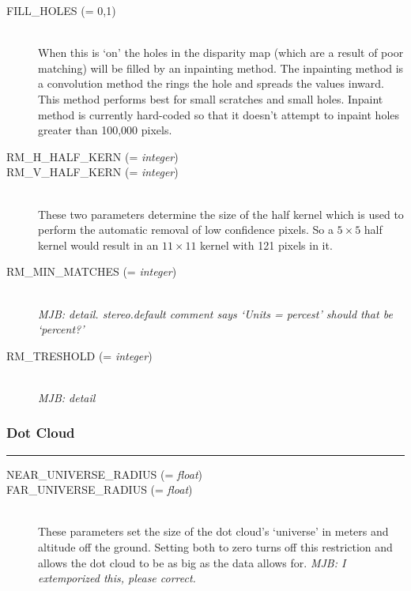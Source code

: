 \begin{description}

\item[FILL\_HOLES \textnormal{\small{(= 0,1)}}] \hfill \\

  When this is `on' the holes in the disparity map (which are a result
  of poor matching) will be filled by an inpainting method. The
  inpainting method is a convolution method the rings the hole and
  spreads the values inward. This method performs best for small
  scratches and small holes. Inpaint method is currently hard-coded so
  that it doesn't attempt to inpaint holes greater than 100,000
  pixels.

\item[RM\_H\_HALF\_KERN \textnormal{\small{(= \emph{integer})}}]
\item[RM\_V\_HALF\_KERN \textnormal{\small{(= \emph{integer})}}] \hfill \\

  These two parameters determine the size of the half kernel which is
  used to perform the automatic removal of low confidence pixels.  So
  a $5 \times 5$ half kernel would result in an $11 \times 11$ kernel
  with 121 pixels in it.

\item[RM\_MIN\_MATCHES \textnormal{\small{(= \emph{integer})}}] \hfill \\

  \emph{MJB: detail.  stereo.default comment says `Units = percest'
    should that be `percent?'}

\item[RM\_TRESHOLD \textnormal{\small{(= \emph{integer})}}] \hfill \\

  \emph{MJB: detail}

\end{description}

\subsubsection*{Dot Cloud}
\hrule
\bigskip

\begin{description}
\item[NEAR\_UNIVERSE\_RADIUS \textnormal{\small{(= \emph{float})}}]
\item[FAR\_UNIVERSE\_RADIUS \textnormal{\small{(= \emph{float})}}] \hfill \\

  These parameters set the size of the dot cloud's `universe' in
  meters and altitude off the ground.  Setting both to zero turns off
  this restriction and allows the dot cloud to be as big as the data
  allows for. \emph{MJB: I extemporized this, please correct.}

\end{description}

